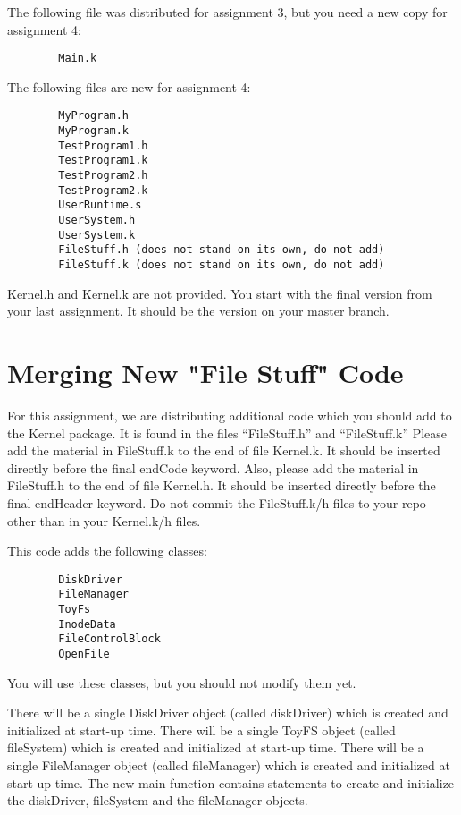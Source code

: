 \documentclass[12pt]{article}
\begin{document}
The following file was distributed for assignment 3, but you need a
new copy for assignment 4:

\begin{verbatim}
        Main.k
\end{verbatim}

The following files are new for assignment 4:

\begin{verbatim}
        MyProgram.h
        MyProgram.k
        TestProgram1.h
        TestProgram1.k
        TestProgram2.h
        TestProgram2.k
        UserRuntime.s
        UserSystem.h
        UserSystem.k
        FileStuff.h (does not stand on its own, do not add)
        FileStuff.k (does not stand on its own, do not add)
\end{verbatim}

Kernel.h and Kernel.k are not provided.  You start with the
final version from your last assignment.  It should be the
version on your master branch.

\section{Merging New "File Stuff" Code}

For this assignment, we are distributing additional code which you
should add to the Kernel package.  It is found in the files
``FileStuff.h'' and ``FileStuff.k'' Please add the material in
FileStuff.k to the end of file Kernel.k.  It should be inserted
directly before the final endCode keyword.  Also, please add the
material in FileStuff.h to the end of file Kernel.h.  It should be
inserted directly before the final endHeader keyword.   Do not
commit the FileStuff.k/h files to your repo other than in your
Kernel.k/h files.

This code adds the following classes:

\begin{verbatim}
        DiskDriver
        FileManager
        ToyFs
        InodeData
        FileControlBlock
        OpenFile
\end{verbatim}

You will use these classes, but you should not modify them yet.

There will be a single DiskDriver object (called diskDriver) which is
created and initialized at start-up time. There will be a single ToyFS
object (called fileSystem) which is created and initialized at
start-up time.  There will be a single FileManager object (called
fileManager) which is created and initialized at start-up time.  The
new main function contains statements to create and initialize the
diskDriver, fileSystem and the fileManager objects.
\end{document}
